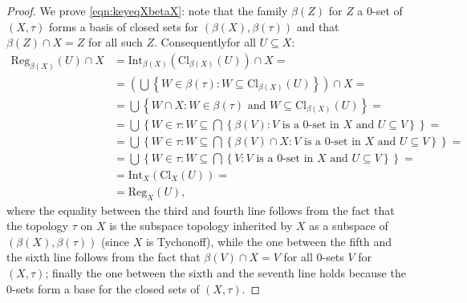 \documentclass[11pt]{amsart}
\theoremstyle{plain}
\theoremstyle{definition}
\theoremstyle{plain}
\theoremstyle{remark}
\newcommand{\bp}[1]{\left\lbrace #1 \right\rbrace}
\newcommand{\0}{\mathsf{0}}
\renewcommand{\1}{\mathsf{1}}
\renewcommand{\2}{\mathsf{2}}
\theoremstyle{definition}
\begin{document}
\begin{proof}
We prove \ref{eqn:keyeqXbetaX}:
note that the family $\beta(Z)$ for $Z$ a $0$-set of $(X,\tau)$ forms a basis of closed sets for $(\beta(X),\beta(\tau))$ and that $\beta(Z)\cap X=Z$ for all such $Z$. Consequentlyfor all $U\subseteq X$:
\begin{align*}
\mathrm{Reg}_{\beta(X)}(U)\cap X&= \mathrm{Int}_{\beta(X)}(\mathrm{Cl}_{\beta(X)}(U))\cap X=\\
&=(\bigcup\bp{W\in\beta(\tau): W\subseteq \mathrm{Cl}_{\beta(X)}(U)})\cap X=\\
&=\bigcup\bp{W\cap X:W\in \beta(\tau)\text{ and } W\subseteq \mathrm{Cl}_{\beta(X)}(U)}=\\
&=\bigcup\bp{W\in\tau: W\subseteq \bigcap \bp{\beta(V): V\text{ is a $0$-set in } X \text{ and }U\subseteq V}}=\\
&=\bigcup\bp{W\in\tau: W\subseteq \bigcap \bp{\beta(V)\cap X: V\text{ is a $0$-set in } X \text{ and }U\subseteq V}}=\\
&=\bigcup\bp{W\in\tau: W\subseteq \bigcap \bp{V: V\text{ is a $0$-set in } X \text{ and }U\subseteq V}}=\\
&=\mathrm{Int}_{X}(\mathrm{Cl}_{X}(U))=\\
&=\mathrm{Reg}_{X}(U),
\end{align*}
where the equality between the third and fourth line follows from the fact that the topology $\tau$ on $X$ is the subspace topology inherited by $X$ as a subspace of $(\beta(X),\beta(\tau))$ (since $X$ is Tychonoff),
while the one between the fifth and the sixth line follows from the fact that $\beta(V)\cap X=V$ for all $0$-sets $V$ for $(X,\tau)$; finally the one between the sixth and the seventh line holds because the $0$-sets form a base for the closed sets of $(X,\tau)$.


\end{proof}
\end{document}
